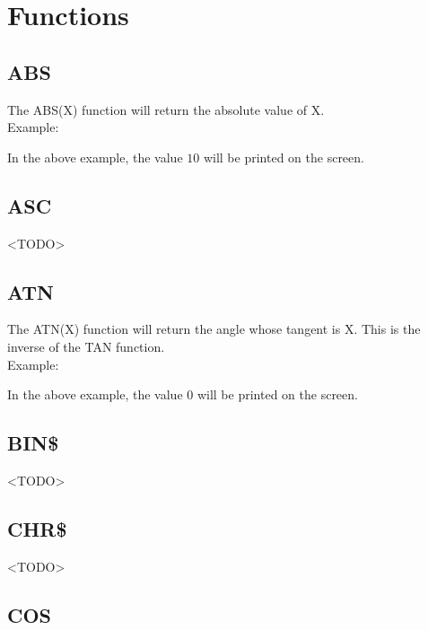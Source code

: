 \section{Functions}

\subsection{ABS}

The {\ttfamily ABS(X)} function will return the absolute value of {\ttfamily
X}.\\

Example:\\

In the above example, the value $10$ will be printed on the screen.

\subsection{ASC}

<TODO>

\subsection{ATN}

The {\ttfamily ATN(X)} function will return the angle whose tangent is
{\ttfamily X}.  This is the inverse of the {\ttfamily TAN} function.\\

Example:\\

In the above example, the value $0$ will be printed on the screen.

\subsection{BIN\$}

<TODO>

\subsection{CHR\$}

<TODO>

\subsection{COS}

